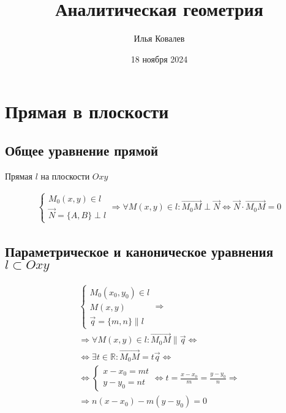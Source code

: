 \documentclass{article}
\begin{document}
\title{Аналитическая геометрия}
\author{Илья Ковалев}
\date{18 ноября 2024}
\maketitle

\section{Прямая в плоскости}

\subsection{Общее уравнение прямой}

Прямая $l$ на плоскости $Oxy$

\begin{gather*}
	\begin{cases}
		M_0(x, y) \in l \\
		\vec{N} = \{ A, B \} \perp l
	\end{cases} \Rightarrow
	\forall M(x, y) \in l : \vec{M_0 M} \perp \vec{N} \Leftrightarrow \vec{N} \cdot \vec{M_0 M} = 0
\end{gather*}

\subsection{Параметрическое и каноническое уравнения \\
$l \subset Oxy$}

\begin{gather*}
	\begin{cases}
		M_0(x_0, y_0) \in l \\
		M(x, y) \\
		\vec{q} = \{ m, n \} \parallel l
	\end{cases} \Rightarrow \\
	\Rightarrow \forall M(x, y) \in l : \vec{M_0 M} \parallel \vec{q} \Leftrightarrow \\
	\Leftrightarrow \exists t \in \mathbb{R} : \vec{M_0 M} = t \vec{q} \Leftrightarrow \\
	\Leftrightarrow \begin{cases}
		x - x_0 = mt \\
		y - y_0 = nt
	\end{cases} \Leftrightarrow t = \frac{x - x_0}{m} = \frac{y - y_0}{n} \Rightarrow \\
	\Rightarrow n(x - x_0) - m(y - y_0) = 0
\end{gather*}
\end{document}
